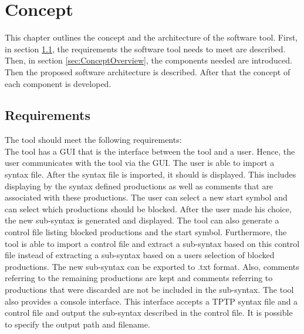 
\chapter{Concept}\label{cha:Concept}
This chapter outlines the concept and the architecture of the software tool.
First, in section \ref{sec:ConceptRequirements}, the requirements the software tool needs to meet are described.
Then, in section \ref{sec:ConceptOverview}, the components needed are introduced.
Then the proposed software architecture is described. After that the concept of each component is developed.

\section{Requirements}\label{sec:ConceptRequirements}
The tool should meet the following requirements:\\
The tool has a GUI that is the interface between the tool and a user. Hence, the user communicates with the tool via the GUI. The user is able to import a syntax file. After the syntax file is imported, it should is displayed. 
This includes displaying by the syntax defined productions as well as comments that are associated with these productions.
The user can select a new start symbol and can select which productions should be blocked. 
After the user made his choice, the new sub-syntax is generated and displayed.
The tool can also generate a control file listing blocked productions and the start symbol.
Furthermore, the tool is able to import a control file and extract a sub-syntax based on this control file instead of extracting a sub-syntax based on a users selection of blocked productions.
The new sub-syntax can be exported to .txt format.
Also, comments referring to the remaining productions are kept and comments referring to productions that were discarded are not be included in the sub-syntax.
The tool also provides a console interface. This interface accepts a \ac{TPTP} syntax file and a control file and output the sub-syntax described in the control file. It is possible to specify the output path and filename.

